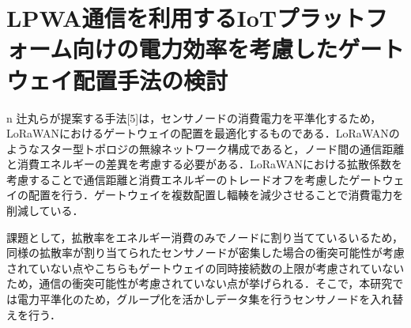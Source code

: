 \section{LPWA通信を利用するIoTプラットフォーム向けの電力効率を考慮したゲートウェイ配置手法の検討}n
辻丸らが提案する手法[5]は，センサノードの消費電力を平準化するため，LoRaWANにおけるゲートウェイの配置を最適化するものである．LoRaWANのようなスター型トポロジの無線ネットワーク構成であると，ノード間の通信距離と消費エネルギーの差異を考慮する必要がある．LoRaWANにおける拡散係数を考慮することで通信距離と消費エネルギーのトレードオフを考慮したゲートウェイの配置を行う．ゲートウェイを複数配置し輻輳を減少させることで消費電力を削減している．

課題として，拡散率をエネルギー消費のみでノードに割り当てているいるため，同様の拡散率が割り当てられたセンサノードが密集した場合の衝突可能性が考慮されていない点やこちらもゲートウェイの同時接続数の上限が考慮されていないため，通信の衝突可能性が考慮されていない点が挙げられる．そこで，本研究では電力平準化のため，グループ化を活かしデータ集を行うセンサノードを入れ替えを行う．
